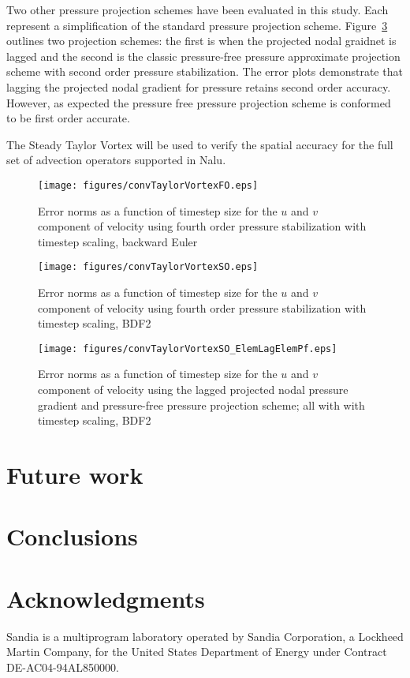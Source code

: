 \documentclass[12pt,final]{article}
\begin{document}
Two other pressure projection schemes have been evaluated in this study. Each represent a 
simplification of the standard pressure projection scheme. Figure~\ref{fig:hybridTstep} outlines
two projection schemes: the first is when the projected nodal graidnet is lagged and the 
second is the classic pressure-free pressure approximate projection scheme with second
order pressure stabilization. The error plots demonstrate that lagging the projected nodal
gradient for pressure retains second order accuracy. However, as expected the pressure
free pressure projection scheme is conformed to be first order accurate.

The 
Steady Taylor Vortex will be used to verify the spatial accuracy for the full set of advection
operators supported in Nalu.
 
\begin{figure}
\centerline{\texttt{[image: figures/convTaylorVortexFO.eps]}}
\caption{Error norms as a function of timestep size for the $u$ and $v$
component of velocity using fourth order pressure stabilization with timestep scaling, backward Euler}
\label{fig:fo4thTstep}
\end{figure}

\begin{figure}
\centerline{\texttt{[image: figures/convTaylorVortexSO.eps]}}
\caption{Error norms as a function of timestep size for the $u$ and $v$
component of velocity using fourth order pressure stabilization with timestep scaling, BDF2}
\label{fig:so4thTstep}
\end{figure}

\begin{figure}
\centerline{\texttt{[image: figures/convTaylorVortexSO\_ElemLagElemPf.eps]}}
\caption{Error norms as a function of timestep size for the $u$ and $v$
component of velocity using the lagged projected nodal pressure gradient and pressure-free pressure projection scheme; all with with timestep scaling, BDF2}
\label{fig:hybridTstep}
\end{figure}

\section{Future work}

\section{Conclusions}

\section*{Acknowledgments}
Sandia is a multiprogram laboratory operated by Sandia Corporation, a Lockheed Martin Company, for the United States Department of Energy under Contract DE-AC04-94AL850000.
\end{document}
